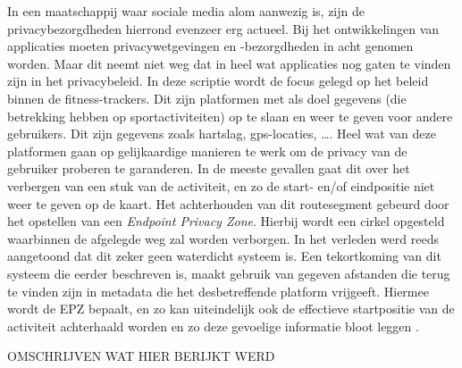 
In een maatschappij waar sociale media alom aanwezig is, zijn de
privacybezorgdheden hierrond evenzeer erg actueel. Bij het ontwikkelingen van
applicaties moeten privacywetgevingen en -bezorgdheden in acht genomen worden.
Maar dit neemt niet weg dat in heel wat applicaties nog gaten te vinden zijn in
het privacybeleid. In deze scriptie wordt de focus gelegd op het beleid binnen
de fitness-trackers. Dit zijn platformen met als doel gegevens (die betrekking
hebben op sportactiviteiten) op te slaan en weer te geven voor andere
gebruikers. Dit zijn gegevens zoals hartslag, gps-locaties, \ldots. Heel wat
van deze platformen gaan op gelijkaardige manieren te werk om de privacy van de
gebruiker proberen te garanderen. In de meeste gevallen gaat dit over het
verbergen van een stuk van de activiteit, en zo de start- en/of eindpositie
niet weer te geven op de kaart. Het achterhouden van dit routesegment gebeurd
door het opstellen van een \textit{Endpoint Privacy Zone}. Hierbij wordt een
cirkel opgesteld waarbinnen de afgelegde weg zal worden verborgen. In het
verleden werd reeds aangetoond dat dit zeker geen waterdicht systeem is. Een
tekortkoming van dit systeem die eerder beschreven is, maakt gebruik van
gegeven afstanden die terug te vinden zijn in metadata die het desbetreffende
platform vrijgeeft. Hiermee wordt de EPZ bepaalt, en zo kan uiteindelijk ook de
effectieve startpositie van de activiteit achterhaald worden en zo deze
gevoelige informatie bloot leggen
\cite{Dhondt_Pochat_Voulimeneas_Joosen_Volckaert_2022}.

OMSCHRIJVEN WAT HIER BERIJKT WERD